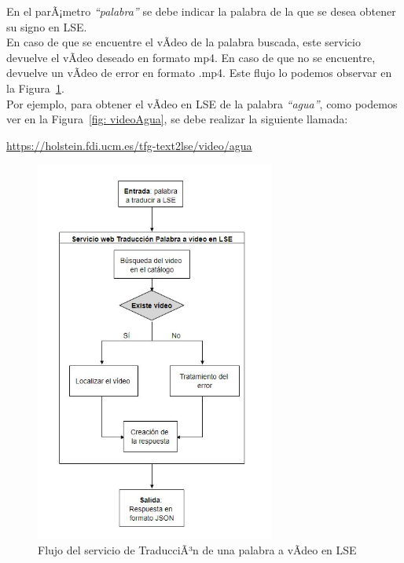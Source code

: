 En el parÃ¡metro \textit{``palabra''} se debe indicar la palabra de la que se desea obtener su signo en LSE. \\

En caso de que se encuentre el vÃ­deo de la palabra buscada, este servicio devuelve el vÃ­deo deseado en formato mp4. En caso de que no se encuentre, devuelve un vÃ­deo de error en formato .mp4. Este flujo lo podemos observar en la Figura~\ref {fig: imgFlujo1palabraText2LSE}. \\

Por ejemplo, para obtener el vÃ­deo en LSE de la palabra \textit{``agua''}, como podemos ver en la Figura~\ref {fig: videoAgua}, se debe realizar la siguiente llamada:

\begin{shaded}
	\url{https://holstein.fdi.ucm.es/tfg-text2lse/video/agua }	
\end{shaded}


\begin{figure}[]
	\centering
	\includegraphics[width=0.7\textwidth]{Imagenes/Fuentes/Text2LSE/FlujoVideo1palabra.jpg}
	\caption{Flujo del servicio de TraducciÃ³n de una palabra a vÃ­deo en LSE}
	\label {fig: imgFlujo1palabraText2LSE}
\end{figure}

